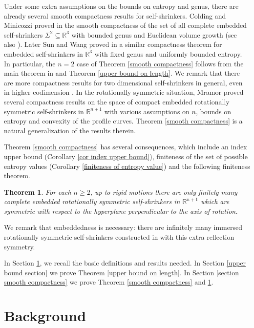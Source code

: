 \documentclass[12pt]{amsart}
\numberwithin{equation}{section}
\newtheorem{thm}{Theorem}[section]
\theoremstyle{remark}
\begin{document}
	Under some extra assumptions on the bounds on entropy and genus, there are already several smooth compactness results for self-shrinkers. Colding and Minicozzi proved in \cite{CM2} the smooth compactness of the set of all complete embedded self-shrinkers $\Sigma^2\subseteq\mathbb R^3$ with bounded genus and Euclidean volume growth (see also \cite[Theorem 1.4]{DX}). Later Sun and Wang proved in \cite{SunWang} a similar compactness theorem for embedded self-shrinkers in $\mathbb R^3$ with fixed genus and uniformly bounded entropy. In particular, the $n=2$ case of Theorem \ref{smooth compactness} follows from the main theorem in \cite{SunWang} and Theorem \ref{upper bound on length}. We remark that there are more compactness results for two dimensional self-shrinkers in general, even in higher codimension \cite{ChenMa1}. In the rotationally symmetric situation, Mramor \cite{Alex} proved several compactness results on the space of compact embedded rotationally symmetric self-shrinkers in $\mathbb R^{n+1}$ with various assumptions on $n$, bounds on entropy and convexity of the profile curves. Theorem \ref{smooth compactness} is a natural generalization of the results therein.
	
	Theorem \ref{smooth compactness} has several consequences, which include an index upper bound (Corollary \ref{cor index upper bound}), finiteness of the set of possible entropy values (Corollary \ref{finiteness of entropy value}) and the following finiteness theorem. 
	
	\begin{thm} \label{finitely many symmetric one}
		For each $n\ge 2$, up to rigid motions there are only finitely many complete embedded rotationally symmetric self-shrinkers in $\mathbb R^{n+1}$ which are symmetric with respect to the hyperplane perpendicular to the axis of rotation. 
	\end{thm}
	
	We remark that embeddedness is necessary:  there are infinitely many immersed rotationally symmetric self-shrinkers constructed in \cite{DK} with this extra reflection symmetry. 
	
	In Section \ref{section basic definition}, we recall the basic definitions and results needed. In Section \ref{upper bound section} we prove Theorem \ref{upper bound on length}. In Section \ref{section smooth compactness} we prove Theorem \ref{smooth compactness} and \ref{finitely many symmetric one}. 
	
	\section{Background} \label{section basic definition}
\end{document}
